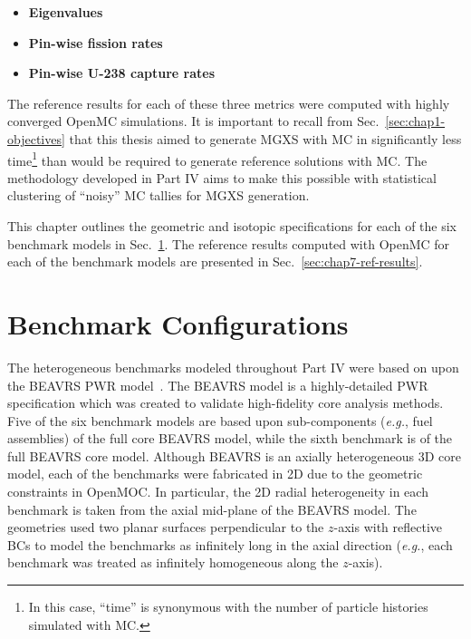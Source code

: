 \begin{itemize}[noitemsep,topsep=0pt]
  \item \textbf{Eigenvalues}
  \item \textbf{Pin-wise fission rates}
  \item \textbf{Pin-wise U-238 capture rates}
\end{itemize}

\noindent The reference results for each of these three metrics were computed with highly converged OpenMC simulations. It is important to recall from Sec.~\ref{sec:chap1-objectives} that this thesis aimed to generate \ac{MGXS} with \ac{MC} in significantly less time\footnote{In this case, ``time'' is synonymous with the number of particle histories simulated with \ac{MC}.} than would be required to generate reference solutions with \ac{MC}. The methodology developed in Part IV aims to make this possible with statistical clustering of ``noisy'' \ac{MC} tallies for \ac{MGXS} generation.

This chapter outlines the geometric and isotopic specifications for each of the six benchmark models in Sec.~\ref{sec:chap7-benchmarks}. The reference results computed with OpenMC for each of the benchmark models are presented in Sec.~\ref{sec:chap7-ref-results}.


\section{Benchmark Configurations}
\label{sec:chap7-benchmarks}

The heterogeneous benchmarks modeled throughout Part IV were based on upon the \ac{BEAVRS} \ac{PWR} model~\cite{horelik2013beavrs}. The \ac{BEAVRS} model is a highly-detailed \ac{PWR} specification which was created to validate high-fidelity core analysis methods. Five of the six benchmark models are based upon sub-components (\textit{e.g.}, fuel assemblies) of the full core \ac{BEAVRS} model, while the sixth benchmark is of the full \ac{BEAVRS} core model. Although \ac{BEAVRS} is an axially heterogeneous 3D core model, each of the benchmarks were fabricated in 2D due to the geometric constraints in OpenMOC. In particular, the 2D radial heterogeneity in each benchmark is taken from the axial mid-plane of the \ac{BEAVRS} model. The geometries used two planar surfaces perpendicular to the $z$-axis with reflective \acp{BC} to model the benchmarks as infinitely long in the axial direction (\textit{e.g.}, each benchmark was treated as infinitely homogeneous along the $z$-axis).

